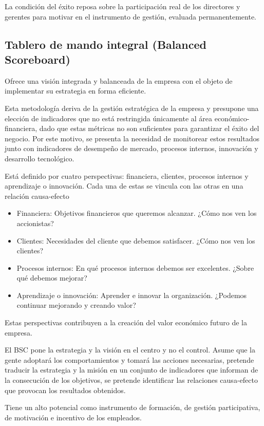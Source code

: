 \documentclass[titlepage,a4paper]{article}
\begin{document}
La condición del éxito reposa sobre la participación real de los directores y gerentes para
motivar en el instrumento de gestión, evaluada permanentemente.

\subsection{Tablero de mando integral (Balanced Scoreboard)}
Ofrece una visión integrada y balanceada de la empresa con el objeto de implementar su estrategia en forma eficiente.

Esta metodología deriva de la gestión estratégica de la empresa y presupone una elección de
indicadores que no está restringida únicamente al área económico-financiera, dado que estas métricas no
son suficientes para garantizar el éxito del negocio. Por este motivo, se presenta la necesidad de
monitorear estos resultados junto con indicadores de desempeño de mercado, procesos internos,
innovación y desarrollo tecnológico.

Está definido por cuatro perspectivas: financiera, clientes, procesos internos y aprendizaje o
innovación. Cada una de estas se vincula con las otras en una relación causa-efecto

\begin{itemize}
    \item Financiera: Objetivos financieros que queremos alcanzar. ¿Cómo nos ven los accionistas?
    \item Clientes: Necesidades del cliente que debemos satisfacer. ¿Cómo nos ven los clientes?
    \item Procesos internos: En qué procesos internos debemos ser excelentes. ¿Sobre qué debemos mejorar?
    \item Aprendizaje o innovación: Aprender e innovar la organización. ¿Podemos continuar mejorando y creando valor?
\end{itemize}

Estas perspectivas contribuyen a la creación del valor económico futuro de la empresa.

El BSC pone la estrategia y la visión en el centro y no el control. Asume que la gente
adoptará los comportamientos y tomará las acciones necesarias, pretende traducir la
estrategia y la misión en un conjunto de indicadores que informan de la consecución de los
objetivos, se pretende identificar las relaciones causa-efecto que provocan los resultados
obtenidos.

Tiene un alto potencial como instrumento de formación, de gestión
participativa, de motivación e incentivo de los empleados.
\end{document}
